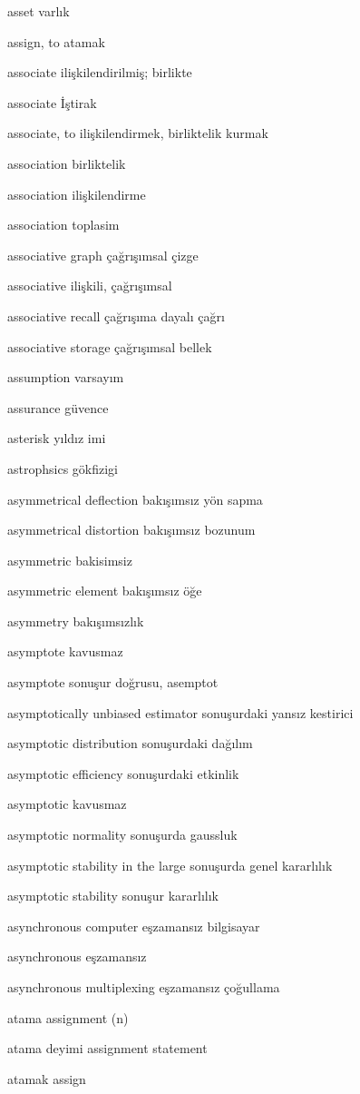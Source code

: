 \documentclass[12pt,fleqn]{article}\usepackage{../../common}
\begin{document}
asset varlık

assign, to atamak

associate ilişkilendirilmiş; birlikte

associate İştirak

associate, to ilişkilendirmek, birliktelik kurmak

association birliktelik

association ilişkilendirme

association toplasim

associative graph çağrışımsal çizge

associative ilişkili, çağrışımsal

associative recall çağrışıma dayalı çağrı

associative storage çağrışımsal bellek

assumption varsayım

assurance güvence

asterisk yıldız imi

astrophsics gökfizigi

asymmetrical deflection bakışımsız yön sapma

asymmetrical distortion bakışımsız bozunum

asymmetric bakisimsiz

asymmetric element bakışımsız öğe

asymmetry bakışımsızlık

asymptote kavusmaz

asymptote sonuşur doğrusu, asemptot

asymptotically unbiased estimator sonuşurdaki yansız kestirici

asymptotic distribution sonuşurdaki dağılım

asymptotic efficiency sonuşurdaki etkinlik

asymptotic kavusmaz

asymptotic normality sonuşurda gaussluk

asymptotic stability in the large sonuşurda genel kararlılık

asymptotic stability sonuşur kararlılık

asynchronous computer eşzamansız bilgisayar

asynchronous eşzamansız

asynchronous multiplexing eşzamansız çoğullama

atama assignment (n)

atama deyimi assignment statement

atamak assign
\end{document}
